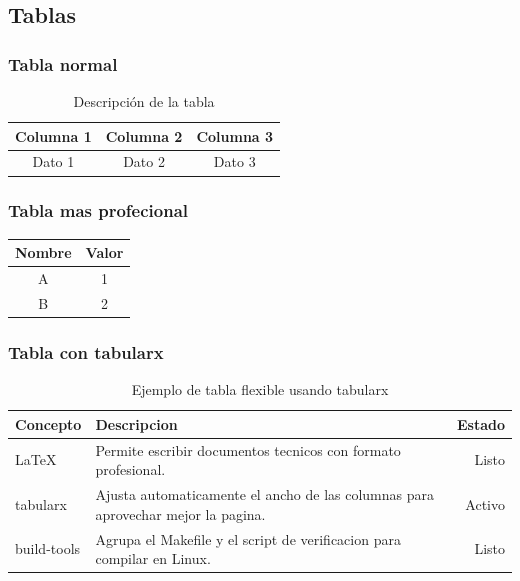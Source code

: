 
\subsection{Tablas}

\subsubsection{Tabla normal}

\begin{table}[H]
    \centering
    \begin{tabular}{|c|c|c|}
        \hline
        Columna 1 & Columna 2 & Columna 3 \\
        \hline
        Dato 1 & Dato 2 & Dato 3 \\
        \hline
    \end{tabular}
    \caption{Descripción de la tabla}
    \label{tab:etiqueta}
\end{table}

\subsubsection{Tabla mas profecional}

\begin{tabular}{cc}
  \toprule
  Nombre & Valor \\
  \midrule
  A & 1 \\
  B & 2 \\
  \bottomrule
\end{tabular}

\subsubsection{Tabla con tabularx}

\begin{table}[H]
    \centering
    \begin{tabularx}{0.85\textwidth}{lXr}
        \toprule
        Concepto & Descripcion & Estado \\
        \midrule
        \LaTeX{} & Permite escribir documentos tecnicos con formato profesional. & Listo \\
        tabularx & Ajusta automaticamente el ancho de las columnas para aprovechar mejor la pagina. & Activo \\
        build-tools & Agrupa el Makefile y el script de verificacion para compilar en Linux. & Listo \\
        \bottomrule
    \end{tabularx}
    \caption{Ejemplo de tabla flexible usando tabularx}
    \label{tab:tabularx-ejemplo}
\end{table}
